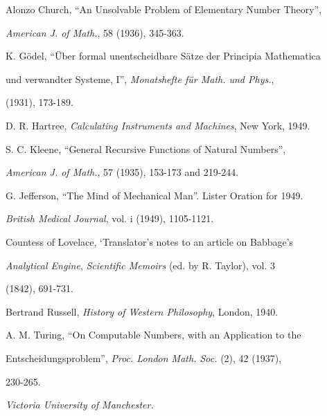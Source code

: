 \documentclass[10pt]{article} %
\begin{document}
\noindent Alonzo Church, ``An Unsolvable Problem of Elementary Number Theory'',\par
\hspace*{1em}\textit{American J. of Math.}, 58 (1936), 345-363.\par
\vspace{0.5\baselineskip}

\noindent K. Gödel, ``Über formal unentscheidbare Sätze der Principia Mathematica\par
\hspace*{1em}und verwandter Systeme, I'', \textit{Monatshefte für Math. und Phys.},\par
\hspace*{1em}(1931), 173-189.\par
\vspace{0.5\baselineskip}

\noindent D. R. Hartree, \textit{Calculating Instruments and Machines}, New York, 1949.\par
\vspace{0.5\baselineskip}

\noindent S. C. Kleene, ``General Recursive Functions of Natural Numbers'',\par
\hspace*{1em}\textit{American J. of Math.}, 57 (1935), 153-173 and 219-244.\par
\vspace{0.5\baselineskip}

\noindent G. Jefferson, ``The Mind of Mechanical Man''. Lister Oration for 1949.\par
\hspace*{1em}\textit{British Medical Journal}, vol. i (1949), 1105-1121.\par
\vspace{0.5\baselineskip}

\noindent Countess of Lovelace, `Translator's notes to an article on Babbage's\par
\hspace*{1em}\textit{Analytical Engine}, \textit{Scientific Memoirs} (ed. by R. Taylor), vol. 3\par
\hspace*{1em}(1842), 691-731.\par
\vspace{0.5\baselineskip}

\noindent Bertrand Russell, \textit{History of Western Philosophy}, London, 1940.\par
\vspace{0.5\baselineskip}

\noindent A. M. Turing, ``On Computable Numbers, with an Application to the\par
\hspace*{1em}Entscheidungsproblem'', \textit{Proc. London Math. Soc.} (2), 42 (1937),\par
\hspace*{1em}230-265.\par

\noindent\textit{Victoria University of Manchester.}
\end{document}
